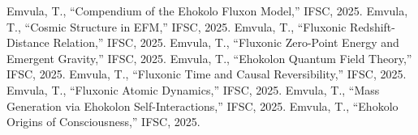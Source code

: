 \documentclass[11pt]{article}
\begin{document}

\begin{thebibliography}{9}
 Emvula, T., ``Compendium of the Ehokolo Fluxon Model,'' IFSC, 2025.
 Emvula, T., ``Cosmic Structure in EFM,'' IFSC, 2025.
 Emvula, T., ``Fluxonic Redshift-Distance Relation,'' IFSC, 2025.
 Emvula, T., ``Fluxonic Zero-Point Energy and Emergent Gravity,'' IFSC, 2025.
 Emvula, T., ``Ehokolon Quantum Field Theory,'' IFSC, 2025.
 Emvula, T., ``Fluxonic Time and Causal Reversibility,'' IFSC, 2025.
 Emvula, T., ``Fluxonic Atomic Dynamics,'' IFSC, 2025.
 Emvula, T., ``Mass Generation via Ehokolon Self-Interactions,'' IFSC, 2025.
 Emvula, T., ``Ehokolo Origins of Consciousness,'' IFSC, 2025.
\end{thebibliography}
\end{document}
